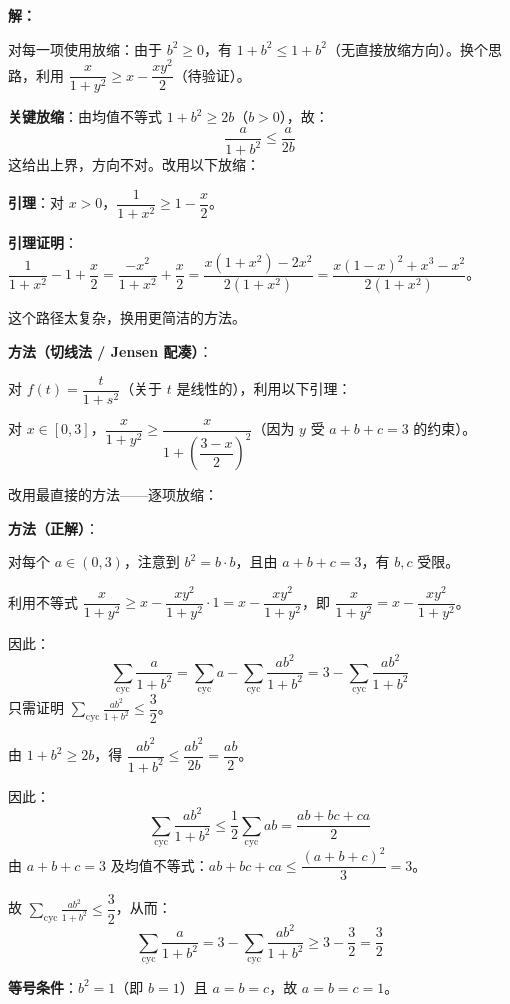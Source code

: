 \documentclass[12pt, a4paper]{ctexart}
\begin{document}
\textbf{解：}

对每一项使用放缩：由于 $b^2 \geqslant 0$，有 $1+b^2 \leqslant 1+b^2$（无直接放缩方向）。换个思路，利用 $\dfrac{x}{1+y^2} \geqslant x - \dfrac{xy^2}{2}$（待验证）。

\textbf{关键放缩}：由均值不等式 $1+b^2 \geqslant 2b$（$b>0$），故：
\[
\frac{a}{1+b^2} \leqslant \frac{a}{2b}
\]
这给出上界，方向不对。改用以下放缩：

\textbf{引理}：对 $x>0$，$\dfrac{1}{1+x^2} \geqslant 1 - \dfrac{x}{2}$。

\textbf{引理证明}：$\dfrac{1}{1+x^2} - 1 + \dfrac{x}{2} = \dfrac{-x^2}{1+x^2}+\dfrac{x}{2} = \dfrac{x(1+x^2)-2x^2}{2(1+x^2)} = \dfrac{x(1-x)^2+ x^3 - x^2}{2(1+x^2)}$。

这个路径太复杂，换用更简洁的方法。

\textbf{方法（切线法 / Jensen 配凑）}：

对 $f(t) = \dfrac{t}{1+s^2}$（关于 $t$ 是线性的），利用以下引理：

对 $x \in [0,3]$，$\dfrac{x}{1+y^2} \geqslant \dfrac{x}{1+\left(\dfrac{3-x}{2}\right)^2}$（因为 $y$ 受 $a+b+c=3$ 的约束）。

改用最直接的方法——逐项放缩：

\textbf{方法（正解）}：

对每个 $a \in (0,3)$，注意到 $b^2 = b \cdot b$，且由 $a+b+c=3$，有 $b,c$ 受限。

利用不等式 $\dfrac{x}{1+y^2} \geqslant x - \dfrac{xy^2}{1+y^2} \cdot 1 = x - \dfrac{xy^2}{1+y^2}$，即 $\dfrac{x}{1+y^2} = x - \dfrac{xy^2}{1+y^2}$。

因此：
\[
\sum_{\text{cyc}}\frac{a}{1+b^2} = \sum_{\text{cyc}} a - \sum_{\text{cyc}}\frac{ab^2}{1+b^2} = 3 - \sum_{\text{cyc}}\frac{ab^2}{1+b^2}
\]
只需证明 $\displaystyle\sum_{\text{cyc}}\frac{ab^2}{1+b^2} \leqslant \dfrac{3}{2}$。

由 $1+b^2 \geqslant 2b$，得 $\dfrac{ab^2}{1+b^2} \leqslant \dfrac{ab^2}{2b} = \dfrac{ab}{2}$。

因此：
\[
\sum_{\text{cyc}}\frac{ab^2}{1+b^2} \leqslant \frac{1}{2}\sum_{\text{cyc}} ab = \frac{ab+bc+ca}{2}
\]
由 $a+b+c=3$ 及均值不等式：$ab+bc+ca \leqslant \dfrac{(a+b+c)^2}{3} = 3$。

故 $\displaystyle\sum_{\text{cyc}}\frac{ab^2}{1+b^2} \leqslant \dfrac{3}{2}$，从而：
\[
\sum_{\text{cyc}}\frac{a}{1+b^2} = 3 - \sum_{\text{cyc}}\frac{ab^2}{1+b^2} \geqslant 3-\frac{3}{2} = \frac{3}{2}
\]

\textbf{等号条件}：$b^2=1$（即 $b=1$）且 $a=b=c$，故 $a=b=c=1$。
\end{document}
